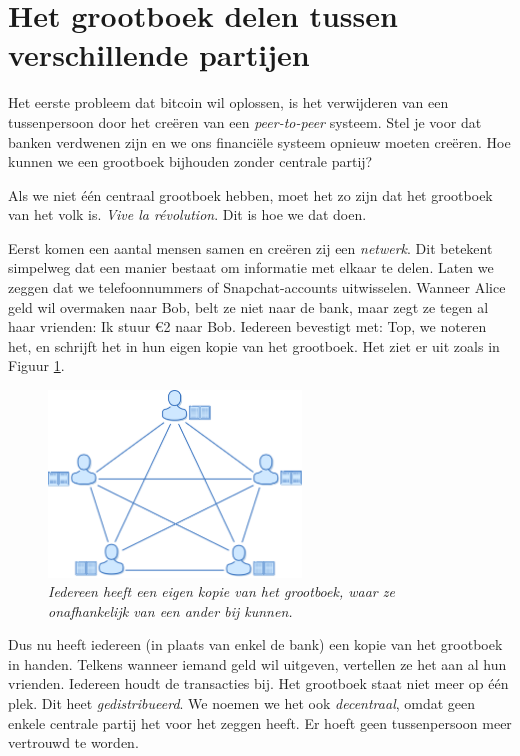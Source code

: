 \section{Het grootboek delen tussen verschillende partijen}

Het eerste probleem dat bitcoin wil oplossen, is het verwijderen van een tussenpersoon door het creëren van een \textit{peer-to-peer} systeem. Stel je voor dat banken verdwenen zijn en we ons financiële systeem opnieuw moeten creëren. Hoe kunnen we een grootboek bijhouden zonder centrale partij?

Als we niet één centraal grootboek hebben, moet het zo zijn dat het grootboek van het volk is. \textit{Vive la révolution}. Dit is hoe we dat doen.

Eerst komen een aantal mensen samen en creëren zij een \textit{netwerk}. Dit betekent simpelweg dat een manier bestaat om informatie met elkaar te delen. Laten we zeggen dat we telefoonnummers of Snapchat-accounts uitwisselen. Wanneer Alice geld wil overmaken naar Bob, belt ze niet naar de bank, maar zegt ze tegen al haar vrienden: \textquotedbl{}Ik stuur €2 naar Bob\textquotedbl{}. Iedereen bevestigt met: \textquotedbl{}Top, we noteren het\textquotedbl{}, en schrijft het in hun eigen kopie van het grootboek. Het ziet er uit zoals in Figuur \ref{fig3}.

\begin{figure}
    \centering
    \includegraphics[width=0.6\textwidth]{images/fig3.png}
    \caption{\footnotesize{\textit{Iedereen heeft een eigen kopie van het grootboek, waar ze onafhankelijk van een ander bij kunnen.}}}
    \label{fig3}
\end{figure}

Dus nu heeft iedereen (in plaats van enkel de bank) een kopie van het grootboek in handen. Telkens wanneer iemand geld wil uitgeven, vertellen ze het aan al hun vrienden. Iedereen houdt de transacties bij. Het grootboek staat niet meer op één plek. Dit heet \textit{gedistribueerd}. We noemen we het ook \textit{decentraal}, omdat geen enkele centrale partij het voor het zeggen heeft. Er hoeft geen tussenpersoon meer vertrouwd te worden.


